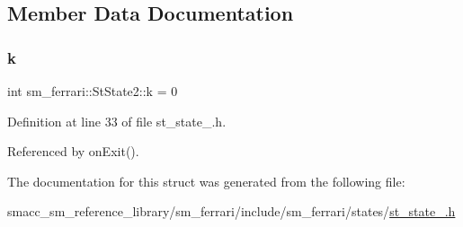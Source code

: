 \subsection{Member Data Documentation}
\mbox{\label{structsm__ferrari_1_1StState2_af43721743ea34cc998b16bc2857f85c3}} 
\subsubsection{\texorpdfstring{k}{k}}
{\footnotesize\ttfamily int sm\+\_\+ferrari\+::\+St\+State2\+::k = 0\hspace{0.3cm}{\ttfamily [static]}}



Definition at line 33 of file st\+\_\+state\+\_.\+h.



Referenced by on\+Exit().



The documentation for this struct was generated from the following file\+:\begin{DoxyCompactItemize}
\item 
smacc\+\_\+sm\+\_\+reference\+\_\+library/sm\+\_\+ferrari/include/sm\+\_\+ferrari/states/\hyperlink{sm__ferrari_2include_2sm__ferrari_2states_2st__state__2_8h}{st\+\_\+state\+\_.\+h}\end{DoxyCompactItemize}
